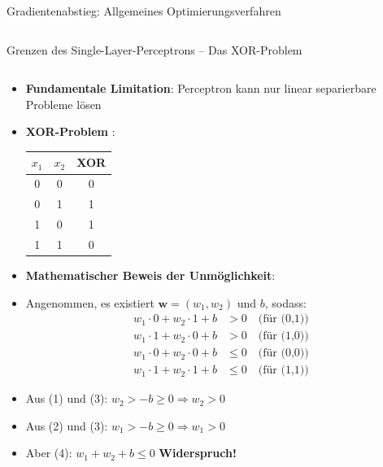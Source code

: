 \documentclass[aspectratio=1610, xcolor=dvipsnames, 9pt]{beamer}
\begin{document}
\begin{frame}{Gradientenabstieg: Allgemeines Optimierungsverfahren}
\begin{columns}
\begin{column}{0.3\textwidth}
          \end{column}
        \end{columns}
      \end{frame}



\begin{frame}{Grenzen des Single-Layer-Perceptrons -- Das XOR-Problem}
  \begin{columns}
    \begin{column}{0.6\textwidth}
      \begin{itemize}
        \item \textbf{Fundamentale Limitation}: Perceptron kann nur linear separierbare Probleme lösen
        \item \textbf{XOR-Problem} \cite{minsky1969}: 
        \begin{center}
        \begin{tabular}{|c|c|c|}
        \hline
        $x_1$ & $x_2$ & XOR \\
        \hline
        0 & 0 & 0 \\
        0 & 1 & 1 \\
        1 & 0 & 1 \\
        1 & 1 & 0 \\
        \hline
        \end{tabular}
        \end{center}
        \item \textbf{Mathematischer Beweis der Unmöglichkeit}: 
        \item Angenommen, es existiert $\mathbf{w} = (w_1, w_2)$ und $b$, sodass:
        \begin{align}
          w_1 \cdot 0 + w_2 \cdot 1 + b &> 0 \quad \text{(für (0,1))} \\
          w_1 \cdot 1 + w_2 \cdot 0 + b &> 0 \quad \text{(für (1,0))} \\
          w_1 \cdot 0 + w_2 \cdot 0 + b &\leq 0 \quad \text{(für (0,0))} \\
          w_1 \cdot 1 + w_2 \cdot 1 + b &\leq 0 \quad \text{(für (1,1))}
        \end{align}
        \item Aus (1) und (3): $w_2 > -b \geq 0 \Rightarrow w_2 > 0$
        \item Aus (2) und (3): $w_1 > -b \geq 0 \Rightarrow w_1 > 0$
        \item Aber (4): $w_1 + w_2 + b \leq 0$ \textbf{Widerspruch!}
      \end{itemize}
    \end{column}

\end{columns}
\end{frame}
\end{document}

